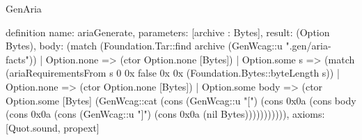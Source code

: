 \begin{lexlean}{GenAria}
\begin{semanticmodule}
definition{
  name: ariaGenerate,
  parameters: [archive : Bytes],
  result: (Option Bytes),
  body: (match (Foundation.Tar::find archive (GenWcag::u ".gen/aria-facts"))
    | Option.none => (ctor Option.none [Bytes])
    | Option.some s => (match (ariaRequirementsFrom s 0 0x false 0x 0x (Foundation.Bytes::byteLength s))
      | Option.none => (ctor Option.none [Bytes])
      | Option.some body => (ctor Option.some [Bytes] (GenWcag::cat (cons (GenWcag::u "[") (cons 0x0a (cons body (cons 0x0a (cons (GenWcag::u "]") (cons 0x0a (nil Bytes))))))))))),
  axioms: [Quot.sound, propext]
}
\end{semanticmodule}
\end{lexlean}
